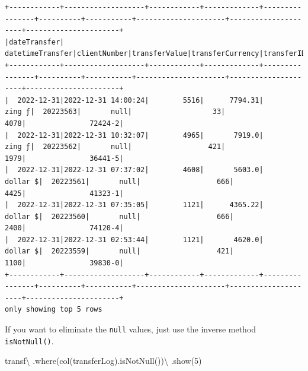 \documentclass[
  11pt,
  letterpaper,
  DIV=11,
  numbers=noendperiod]{scrreprt}
\newenvironment{Shaded}{\begin{snugshade}}{\end{snugshade}}
\newcommand{\DecValTok}[1]{\textcolor[rgb]{0.68,0.00,0.00}{#1}}
\newcommand{\NormalTok}[1]{\textcolor[rgb]{0.00,0.23,0.31}{#1}}
\newcommand{\OperatorTok}[1]{\textcolor[rgb]{0.37,0.37,0.37}{#1}}
\newcommand{\StringTok}[1]{\textcolor[rgb]{0.13,0.47,0.30}{#1}}
\begin{document}
\begin{verbatim}
+------------+-------------------+------------+-------------+----------------+----------+-----------+---------------------+---------------------+----------------------+
|dateTransfer|   datetimeTransfer|clientNumber|transferValue|transferCurrency|transferID|transferLog|destinationBankNumber|destinationBankBranch|destinationBankAccount|
+------------+-------------------+------------+-------------+----------------+----------+-----------+---------------------+---------------------+----------------------+
|  2022-12-31|2022-12-31 14:00:24|        5516|      7794.31|          zing ƒ|  20223563|       null|                   33|                 4078|               72424-2|
|  2022-12-31|2022-12-31 10:32:07|        4965|       7919.0|          zing ƒ|  20223562|       null|                  421|                 1979|               36441-5|
|  2022-12-31|2022-12-31 07:37:02|        4608|       5603.0|        dollar $|  20223561|       null|                  666|                 4425|               41323-1|
|  2022-12-31|2022-12-31 07:35:05|        1121|      4365.22|        dollar $|  20223560|       null|                  666|                 2400|               74120-4|
|  2022-12-31|2022-12-31 02:53:44|        1121|       4620.0|        dollar $|  20223559|       null|                  421|                 1100|               39830-0|
+------------+-------------------+------------+-------------+----------------+----------+-----------+---------------------+---------------------+----------------------+
only showing top 5 rows
\end{verbatim}

If you want to eliminate the \texttt{null} values, just use the inverse
method \texttt{isNotNull()}.

\begin{Shaded}
\begin{Highlighting}[]
\NormalTok{transf}\OperatorTok{\textbackslash{}}
\NormalTok{  .where(col(}\StringTok{\textquotesingle{}transferLog\textquotesingle{}}\NormalTok{).isNotNull())}\OperatorTok{\textbackslash{}}
\NormalTok{  .show(}\DecValTok{5}\NormalTok{)}
\end{Highlighting}
\end{Shaded}
\end{document}
